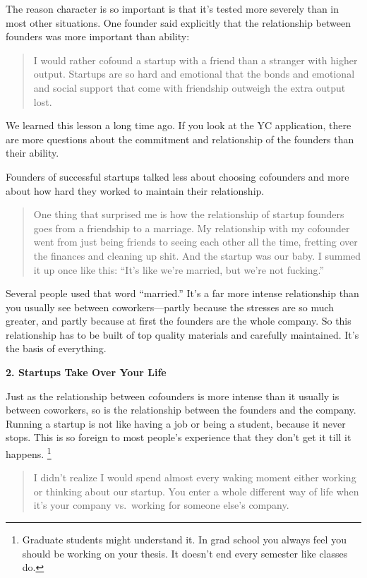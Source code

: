 The reason character is so important is that it's tested more severely
than in most other situations. One founder said explicitly that the
relationship between founders was more important than ability:

\begin{quote}
I would rather cofound a startup with a friend than a stranger with
higher output. Startups are so hard and emotional that the bonds and
emotional and social support that come with friendship outweigh the
extra output lost.
\end{quote}

We learned this lesson a long time ago. If you look at the YC
application, there are more questions about the commitment and
relationship of the founders than their ability.

Founders of successful startups talked less about choosing cofounders
and more about how hard they worked to maintain their relationship.

\begin{quote}
One thing that surprised me is how the relationship of startup founders
goes from a friendship to a marriage. My relationship with my cofounder
went from just being friends to seeing each other all the time, fretting
over the finances and cleaning up shit. And the startup was our baby. I
summed it up once like this: ``It's like we're married, but we're not
fucking.''
\end{quote}

Several people used that word ``married.'' It's a far more intense
relationship than you usually see between coworkers---partly because the
stresses are so much greater, and partly because at first the founders
are the whole company. So this relationship has to be built of top
quality materials and carefully maintained. It's the basis of
everything.

\textbf{2. Startups Take Over Your Life}

Just as the relationship between cofounders is more intense than it
usually is between coworkers, so is the relationship between the
founders and the company. Running a startup is not like having a job or
being a student, because it never stops. This is so foreign to most
people's experience that they don't get it till it happens.
\footnote{Graduate students might understand it. In grad school you always
feel you should be working on your thesis. It doesn't end every semester
like classes do.}

\begin{quote}
I didn't realize I would spend almost every waking moment either working
or thinking about our startup. You enter a whole different way of life
when it's your company vs.~working for someone else's company.
\end{quote}

